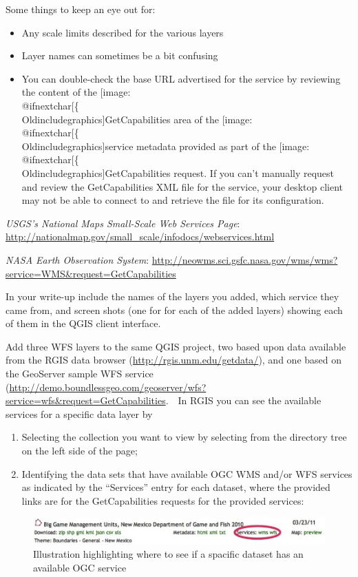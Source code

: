 \documentclass[]{book}
\makeatletter
\providecommand{\tightlist}{%
  \setlength{\itemsep}{0pt}\setlength{\parskip}{0pt}}
\def\ScaleIfNeeded{%
  \ifdim\Gin@nat@width>.5\linewidth
    .5\linewidth
  \else
    \Gin@nat@width
  \fi
}
\let\Oldincludegraphics\texttt{[image: \%
 \\catcode`\\@=11\\relax\%
 \%\\gdef\\includegraphics\{\\@ifnextchar[\{\\Oldincludegraphics]}{\Oldincludegraphics[width=\ScaleIfNeeded]}}%
\gdef\texttt{[image: \\@ifnextchar[\{\\Oldincludegraphics]}{\Oldincludegraphics[max size={.75\textwidth}{.75\textheight}]}}%
\makeatother
\begin{document}
Some things to keep an eye out for:

\begin{itemize}
\tightlist
\item
  Any scale limits described for the various layers
\item
  Layer names can sometimes be a bit confusing
\item
  You can double-check the base URL advertised for the service by
  reviewing the content of the \texttt{GetCapabilities} area of the
  \texttt{service} metadata provided as part of the
  \texttt{GetCapabilities} request. If you can't manually request and
  review the GetCapabilities XML file for the service, your desktop
  client may not be able to connect to and retrieve the file for its
  configuration.
\end{itemize}

\emph{USGS's National Maps \emph{Small-Scale Web Services} Page}:
\url{http://nationalmap.gov/small_scale/infodocs/webservices.html}

\emph{NASA Earth Observation System}:
\url{http://neowms.sci.gsfc.nasa.gov/wms/wms?service=WMS\&request=GetCapabilities}

In your write-up include the names of the layers you added, which
service they came from, and screen shots (one for for each of the added
layers) showing each of them in the QGIS client interface.

Add three WFS layers to the same QGIS project, two based upon data
available from the RGIS data browser
(\url{http://rgis.unm.edu/getdata/}), and one based on the GeoServer
sample WFS service
(\url{http://demo.boundlessgeo.com/geoserver/wfs?service=wfs\&request=GetCapabilities}.
  In RGIS you can see the available services for a specific data layer
by

\begin{enumerate}
\def\labelenumi{\arabic{enumi}.}
\item
  Selecting the collection you want to view by selecting from the
  directory tree on the left side of the page;
\item
  Identifying the data sets that have available OGC WMS and/or WFS
  services as indicated by the ``Services'' entry for each dataset,
  where the provided links are for the GetCapabilities requests for the
  provided services:
\end{enumerate}

\begin{figure}[htbp]
\centering
\includegraphics{images/RGIS_OGCLinkScreenshot.jpg}
\caption{Illustration highlighting where to see if a spacific dataset
has an available OGC service}
\end{figure}
\end{document}
